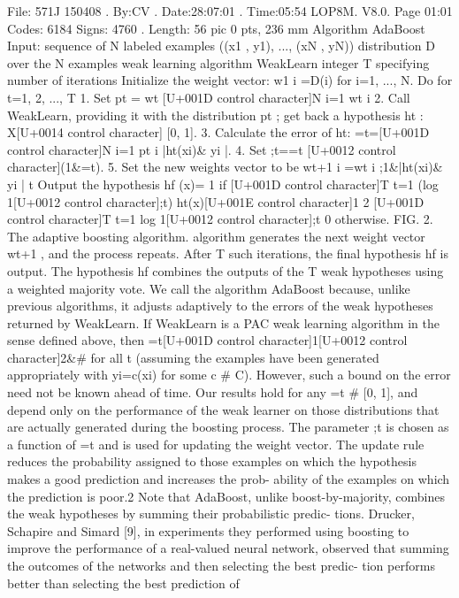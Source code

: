 \documentclass[10pt]{article}
\begin{document}
\begin{ReviewVerbatim}
File: 571J 150408 . By:CV . Date:28:07:01 . Time:05:54 LOP8M. V8.0. Page 01:01
Codes: 6184 Signs: 4760 . Length: 56 pic 0 pts, 236 mm
Algorithm AdaBoost
Input: sequence of N labeled examples ((x1 , y1), ..., (xN , yN))
distribution D over the N examples
weak learning algorithm WeakLearn
integer T specifying number of iterations
Initialize the weight vector: w1
i =D(i) for i=1, ..., N.
Do for t=1, 2, ..., T
1. Set
pt
=
wt
[U+001D control character]N
i=1 wt
i
2. Call WeakLearn, providing it with the distribution pt
; get back a
hypothesis ht : X[U+0014 control character] [0, 1].
3. Calculate the error of ht: =t=[U+001D control character]N
i=1 pt
i |ht(xi)& yi |.
4. Set ;t==t [U+0012 control character](1&=t).
5. Set the new weights vector to be
wt+1
i =wt
i ;1&|ht(xi)& yi |
t
Output the hypothesis
hf (x)=
{
1 if [U+001D control character]T
t=1 (log 1[U+0012 control character];t) ht(x)[U+001E control character]1
2 [U+001D control character]T
t=1 log 1[U+0012 control character];t
0 otherwise.
FIG. 2. The adaptive boosting algorithm.
algorithm generates the next weight vector wt+1
, and the
process repeats. After T such iterations, the final hypothesis
hf is output. The hypothesis hf combines the outputs of the
T weak hypotheses using a weighted majority vote.
We call the algorithm AdaBoost because, unlike previous
algorithms, it adjusts adaptively to the errors of the weak
hypotheses returned by WeakLearn. If WeakLearn is a PAC
weak learning algorithm in the sense defined above, then
=t[U+001D control character]1[U+0012 control character]2&# for all t (assuming the examples have been
generated appropriately with yi=c(xi) for some c # C).
However, such a bound on the error need not be known
ahead of time. Our results hold for any =t # [0, 1], and
depend only on the performance of the weak learner on
those distributions that are actually generated during the
boosting process.
The parameter ;t is chosen as a function of =t and is used
for updating the weight vector. The update rule reduces
the probability assigned to those examples on which the
hypothesis makes a good prediction and increases the prob-
ability of the examples on which the prediction is poor.2
Note that AdaBoost, unlike boost-by-majority, combines
the weak hypotheses by summing their probabilistic predic-
tions. Drucker, Schapire and Simard [9], in experiments
they performed using boosting to improve the performance
of a real-valued neural network, observed that summing the
outcomes of the networks and then selecting the best predic-
tion performs better than selecting the best prediction of
}
\end{ReviewVerbatim}
\end{document}
